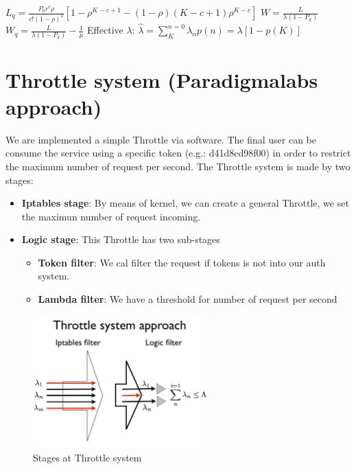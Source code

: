 \documentclass[a4paper,11pt]{article}
\begin{document}
$L_q = \displaystyle \frac{P_0 r^c \rho}{c! {(1 - \rho)}^2} [ 1 - {\rho}^{K-c+1} - (1-\rho)(K - c +1) {\rho}^{K-c} ]$
$W = \displaystyle \frac{L}{\lambda (1 - P_k)}$
$W_q = \displaystyle \frac{L}{\lambda (1 - P_k)} - \frac{1}{\mu}$
Effective $\lambda$: $\hat{\lambda} = \displaystyle \sum\limits^{n=0}_{K} \lambda_n p(n) = \lambda[1-p(K)] $ 




\newpage
\section{Throttle system (Paradigmalabs approach)}
We are implemented a simple Throttle via software. The final user can be consume the service using a specific token (e.g.: d41d8cd98f00)
 in order to restrict the maximum number of request per second. The Throttle system is made by two stages:
 \begin{itemize}
 \item {\bf Iptables stage}: By means of kernel, we can create a general Throttle, we set the maximun number of request incoming.
 \item {\bf Logic stage}: This Throttle has two sub-stages
 	\begin{itemize}
 	\item {\bf Token filter}: We cal filter the request if tokens is not into our auth system.
 	\item {\bf Lambda filter}: We have a threshold for number of request per second
 	\end{itemize}
 \end{itemize}

\begin{figure}[htb]
\begin{center}
\includegraphics[width=0.6\textwidth]{img/throttle_system.pdf}
\caption{Stages at Throttle system}
\end{center}
\end{figure}
\end{document}

